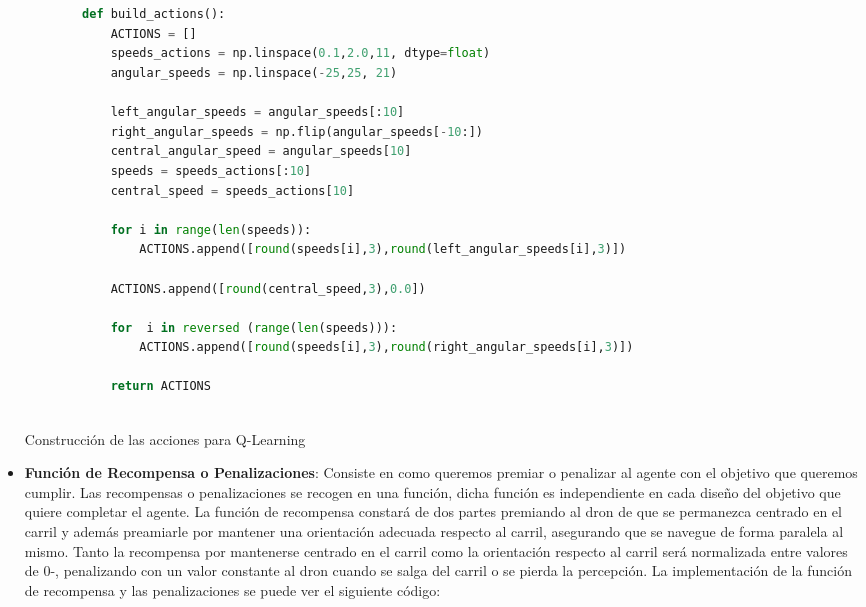 \begin{itemize}
    \begin{code}[h]
      \begin{lstlisting}[language=Python]
  
        
        def build_actions():
            ACTIONS = []
            speeds_actions = np.linspace(0.1,2.0,11, dtype=float)
            angular_speeds = np.linspace(-25,25, 21)
        
            left_angular_speeds = angular_speeds[:10]
            right_angular_speeds = np.flip(angular_speeds[-10:])
            central_angular_speed = angular_speeds[10]
            speeds = speeds_actions[:10]
            central_speed = speeds_actions[10]
        
            for i in range(len(speeds)):
                ACTIONS.append([round(speeds[i],3),round(left_angular_speeds[i],3)])
        
            ACTIONS.append([round(central_speed,3),0.0])
        
            for  i in reversed (range(len(speeds))):
                ACTIONS.append([round(speeds[i],3),round(right_angular_speeds[i],3)])
  
            return ACTIONS
       
      \end{lstlisting}
      \caption[Construcción de las acciones para Q-Learning]{Construcción de las acciones para Q-Learning}
      \label{cod:codejemplo}
      \end{code}
      
    \item \textbf{Función de Recompensa o Penalizaciones}: Consiste en como queremos premiar o penalizar al agente con el objetivo que queremos cumplir. Las recompensas o penalizaciones se recogen
    en una función, dicha función es independiente en cada diseño del objetivo que quiere completar el agente. La función de recompensa constará de dos partes premiando al dron de que se 
    permanezca centrado en el carril y además preamiarle por mantener una orientación adecuada respecto al carril, asegurando que se navegue de forma paralela al mismo. Tanto la recompensa por 
    mantenerse centrado en el carril como la orientación respecto al carril será normalizada entre valores de 0-, penalizando con un valor constante al dron cuando se salga del carril o 
    se pierda la percepción. La implementación de la función de recompensa y las penalizaciones se puede ver el siguiente código:

    \begin{code}[H]
      \begin{lstlisting}[language=Python]
  

\end{lstlisting}
\end{code}
\end{itemize}
